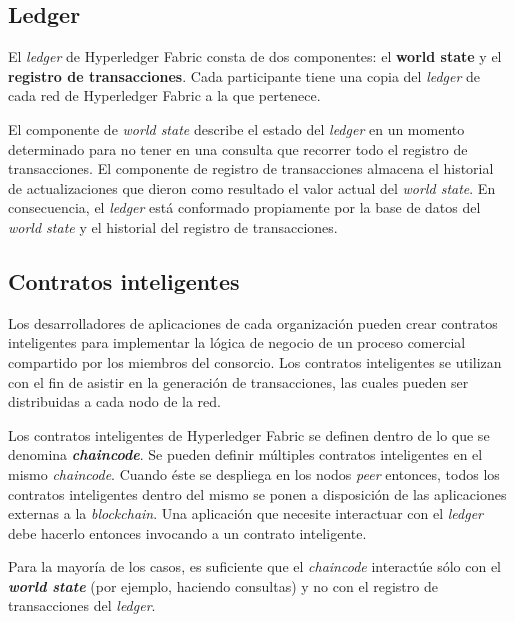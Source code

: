 
\subsection{Ledger}

El \textit{ledger} de Hyperledger Fabric consta de dos componentes: el \textbf{world state} y el \textbf{registro de transacciones}. Cada participante tiene una copia del \textit{ledger} de cada red de Hyperledger Fabric a la que pertenece.

El componente de \textit{world state} describe el estado del \textit{ledger} en un momento determinado para no tener en una consulta que recorrer todo el registro de transacciones. El componente de registro de transacciones almacena el historial de actualizaciones que dieron como resultado el valor actual del \textit{world state}. En consecuencia, el \textit{ledger} está conformado propiamente por la base de datos del \textit{world state} y el historial del registro de transacciones.

\subsection{Contratos inteligentes}

Los desarrolladores de aplicaciones de cada organización pueden crear contratos inteligentes para implementar la lógica de negocio de un proceso comercial compartido por los miembros del consorcio. Los contratos inteligentes se utilizan con el fin de asistir en la generación de transacciones, las cuales pueden ser distribuidas a cada nodo de la red.

Los contratos inteligentes de Hyperledger Fabric se definen dentro de lo que se denomina \textbf{\textit{chaincode}}. Se pueden definir múltiples contratos inteligentes en el mismo \textit{chaincode}. Cuando éste se despliega en los nodos \textit{peer} entonces, todos los contratos inteligentes dentro del mismo se ponen a disposición de  las aplicaciones externas a la \textit{blockchain}. Una aplicación que necesite interactuar con el \textit{ledger} debe hacerlo entonces invocando a un  contrato inteligente. 

Para la mayoría de los casos, es suficiente que el \textit{chaincode} interactúe sólo con el \textbf{\textit{world state}} (por ejemplo, haciendo consultas) y no con el registro de transacciones del \textit{ledger}.

